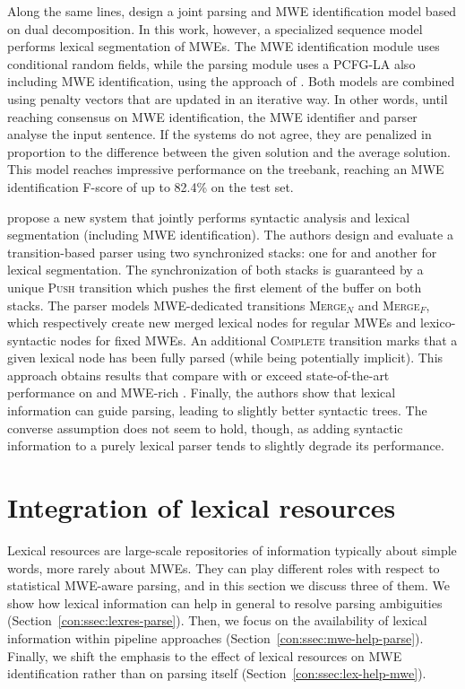 \documentclass[output=paper]{langsci/langscibook}
\begin{document}
Along the same lines, \citet{leroux14} design a joint parsing and MWE identification model based on dual decomposition.
In this work, however, a specialized sequence model performs lexical segmentation of MWEs.
The MWE identification module uses conditional random fields, while the parsing module uses a PCFG-LA also including MWE identification, using the approach of \citet{green13}. 
Both models are combined using penalty vectors that are updated in an iterative way.
In other words, until reaching consensus on MWE identification, the MWE identifier and parser analyse the input sentence.
If the systems do not agree, they are penalized in proportion to the difference between the given solution and the average solution.
This model reaches impressive performance on the  treebank, reaching an MWE identification F-score of up to 82.4\% on the test set.


\citet{constantnivre16} propose a new  system that jointly performs syntactic analysis and lexical segmentation (including MWE identification).
The authors design and evaluate a transition-based parser using two synchronized stacks: one for  and another for lexical segmentation.
The synchronization of both stacks is guaranteed by a unique {\scshape Push} transition which pushes the first element of the buffer on both stacks.
The parser models MWE-dedicated transitions {\scshape Merge$_N$} and {\scshape Merge$_F$}, which respectively create new merged lexical nodes for regular MWEs and lexico-syntactic nodes for fixed MWEs.
An additional {\scshape Complete} transition marks that a given lexical node has been fully parsed (while being potentially implicit). This approach obtains results that compare with or exceed state-of-the-art performance on  and  MWE-rich .
Finally, the authors show that lexical information can guide parsing, leading to slightly better syntactic trees.
The converse assumption does not seem to hold, though, as adding syntactic information to a purely lexical parser tends to slightly degrade its performance.



%
\section{Integration of lexical resources}
\label{con:sec:resources}

Lexical resources are large-scale repositories of information typically about simple words, more rarely about MWEs. 
They can play different roles with respect to statistical MWE-aware parsing, and in this section we discuss three of them. We show how lexical information can help in general to resolve parsing ambiguities (Section~\ref{con:ssec:lexres-parse}). Then, we focus on the availability of lexical information within pipeline approaches (Section~\ref{con:ssec:mwe-help-parse}). Finally, we shift the emphasis to the effect of lexical resources on MWE identification rather than on parsing itself (Section~\ref{con:ssec:lex-help-mwe}).
\end{document}
